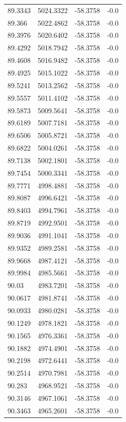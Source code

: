 \begin{table}[H]
\begin{tabular}{llll}
89.3343 & 5024.3322 & -58.3758 & -0.0 \\
89.366 & 5022.4862 & -58.3758 & -0.0 \\
89.3976 & 5020.6402 & -58.3758 & -0.0 \\
89.4292 & 5018.7942 & -58.3758 & -0.0 \\
89.4608 & 5016.9482 & -58.3758 & -0.0 \\
89.4925 & 5015.1022 & -58.3758 & -0.0 \\
89.5241 & 5013.2562 & -58.3758 & -0.0 \\
89.5557 & 5011.4102 & -58.3758 & -0.0 \\
89.5873 & 5009.5641 & -58.3758 & -0.0 \\
89.6189 & 5007.7181 & -58.3758 & -0.0 \\
89.6506 & 5005.8721 & -58.3758 & -0.0 \\
89.6822 & 5004.0261 & -58.3758 & -0.0 \\
89.7138 & 5002.1801 & -58.3758 & -0.0 \\
89.7454 & 5000.3341 & -58.3758 & -0.0 \\
89.7771 & 4998.4881 & -58.3758 & -0.0 \\
89.8087 & 4996.6421 & -58.3758 & -0.0 \\
89.8403 & 4994.7961 & -58.3758 & -0.0 \\
89.8719 & 4992.9501 & -58.3758 & -0.0 \\
89.9036 & 4991.1041 & -58.3758 & -0.0 \\
89.9352 & 4989.2581 & -58.3758 & -0.0 \\
89.9668 & 4987.4121 & -58.3758 & -0.0 \\
89.9984 & 4985.5661 & -58.3758 & -0.0 \\
90.03 & 4983.7201 & -58.3758 & -0.0 \\
90.0617 & 4981.8741 & -58.3758 & -0.0 \\
90.0933 & 4980.0281 & -58.3758 & -0.0 \\
90.1249 & 4978.1821 & -58.3758 & -0.0 \\
90.1565 & 4976.3361 & -58.3758 & -0.0 \\
90.1882 & 4974.4901 & -58.3758 & -0.0 \\
90.2198 & 4972.6441 & -58.3758 & -0.0 \\
90.2514 & 4970.7981 & -58.3758 & -0.0 \\
90.283 & 4968.9521 & -58.3758 & -0.0 \\
90.3146 & 4967.1061 & -58.3758 & -0.0 \\
90.3463 & 4965.2601 & -58.3758 & -0.0 \\

\end{tabular}
\end{table}
